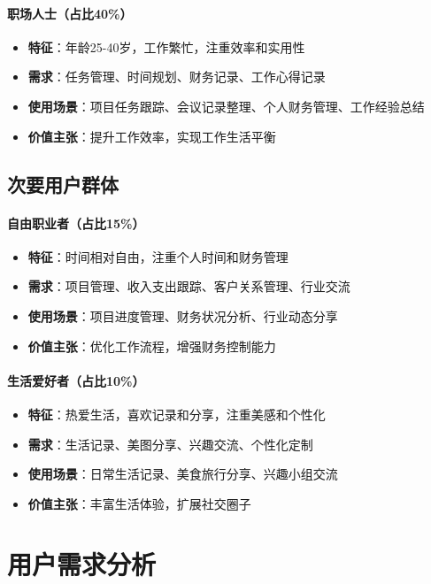 \documentclass[a4paper]{article}
\begin{document}
\paragraph{职场人士（占比40\%）}
\begin{itemize}
    \item \textbf{特征}：年龄25-40岁，工作繁忙，注重效率和实用性
    \item \textbf{需求}：任务管理、时间规划、财务记录、工作心得记录
    \item \textbf{使用场景}：项目任务跟踪、会议记录整理、个人财务管理、工作经验总结
    \item \textbf{价值主张}：提升工作效率，实现工作生活平衡
\end{itemize}

\subsection{次要用户群体}

\paragraph{自由职业者（占比15\%）}
\begin{itemize}
    \item \textbf{特征}：时间相对自由，注重个人时间和财务管理
    \item \textbf{需求}：项目管理、收入支出跟踪、客户关系管理、行业交流
    \item \textbf{使用场景}：项目进度管理、财务状况分析、行业动态分享
    \item \textbf{价值主张}：优化工作流程，增强财务控制能力
\end{itemize}

\paragraph{生活爱好者（占比10\%）}
\begin{itemize}
    \item \textbf{特征}：热爱生活，喜欢记录和分享，注重美感和个性化
    \item \textbf{需求}：生活记录、美图分享、兴趣交流、个性化定制
    \item \textbf{使用场景}：日常生活记录、美食旅行分享、兴趣小组交流
    \item \textbf{价值主张}：丰富生活体验，扩展社交圈子
\end{itemize}

\section{用户需求分析}
\end{document}

